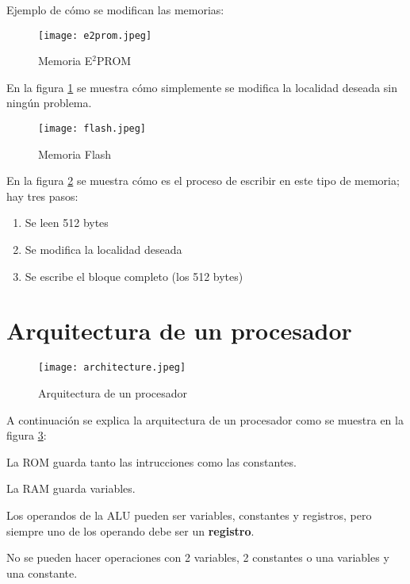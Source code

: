\documentclass{article}
\begin{document}
\vspace{1em}
Ejemplo de cómo se modifican las memorias:

\begin{figure}[h!]
	\texttt{[image: e2prom.jpeg]}
	\caption{Memoria E$^2$PROM}
	\label{fig:e2prom}
\end{figure}

En la figura \ref{fig:e2prom} se muestra cómo simplemente se modifica la localidad
deseada sin ningún problema.

\begin{figure}[h!]
	\texttt{[image: flash.jpeg]}
	\caption{Memoria Flash}
	\label{fig:Flash}
\end{figure}

\newpage

En la figura \ref{fig:Flash} se muestra cómo es el proceso de escribir en este
tipo de memoria; hay tres pasos:

\begin{enumerate}
	\item
		Se leen 512 bytes
	\item
	Se modifica la localidad deseada
	\item
		Se escribe el bloque completo (los 512 bytes)
\end{enumerate}

\section{Arquitectura de un procesador}

\begin{figure}[h!]
	\texttt{[image: architecture.jpeg]}
	\caption{Arquitectura de un procesador}
	\label{fig:Archi}
\end{figure}

A continuación se explica la arquitectura de un procesador como se muestra en la
figura \ref{fig:Archi}:

\vspace{1em}
La ROM guarda tanto las intrucciones como las constantes.

\vspace{1em}
La RAM guarda variables.

\vspace{1em}
Los operandos de la ALU pueden ser variables, constantes y registros, pero siempre
uno de los operando debe ser un \textbf{registro}.

No se pueden hacer operaciones con 2 variables, 2 constantes o una variables y
una constante.
\end{document}
